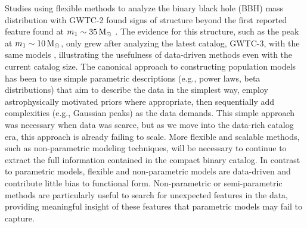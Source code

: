 Studies using flexible methods to analyze the binary black hole (BBH) mass distribution with GWTC-2 found signs of structure beyond the first reported feature found at 
$m_1\sim35\,{\rm M}_\odot$ \citep{Talbot_2018,o3a_pop,Tiwari_2021_b,Edelman_2022ApJ}. The evidence for this structure, 
such as the peak at $m_1\sim10\,{\rm M}_\odot$, only grew after analyzing the latest catalog, GWTC-3, with the same models \citep{o3b_astro_dist,Tiwari_2022ApJ}, illustrating  
the usefulness of data-driven methods even with the current catalog size. The canonical approach to constructing population models has been 
to use simple parametric descriptions (e.g., power laws, beta distributions) that aim to describe the data in the simplest way, employ astrophysically motivated priors where appropriate, then sequentially add 
complexities (e.g., Gaussian peaks) as the data demands. This simple approach was necessary when data was scarce, but as we move into the data-rich catalog era, this approach is already failing to scale.  More flexible and scalable methods, such as non-parametric modeling techniques, will be necessary to continue to extract the full information contained in the compact binary catalog. In contrast to parametric models, flexible and non-parametric models are data-driven and 
contribute little bias to functional form. Non-parametric or semi-parametric methods are particularly useful to search for unexpected features in the 
data, providing meaningful insight of these features that parametric models may fail to capture.

